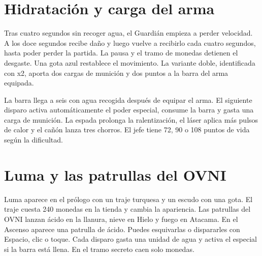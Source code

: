 \section{Hidratación y carga del arma}
Tras cuatro segundos sin recoger agua, el Guardián empieza a perder velocidad. A los doce segundos recibe daño y luego vuelve a recibirlo cada cuatro segundos, hasta poder perder la partida. La pausa y el tramo de monedas detienen el desgaste. Una gota azul restablece el movimiento. La variante doble, identificada con x2, aporta dos cargas de munición y dos puntos a la barra del arma equipada.

La barra llega a seis con agua recogida después de equipar el arma. El siguiente disparo activa automáticamente el poder especial, consume la barra y gasta una carga de munición. La espada prolonga la ralentización, el láser aplica más pulsos de calor y el cañón lanza tres chorros. El jefe tiene 72, 90 o 108 puntos de vida según la dificultad.


\section{Luma y las patrullas del OVNI}
Luma aparece en el prólogo con un traje turquesa y un escudo con una gota. El traje cuesta 240 monedas en la tienda y cambia la apariencia. Las patrullas del OVNI lanzan ácido en la llanura, nieve en Hielo y fuego en Atacama. En el Ascenso aparece una patrulla de ácido. Puedes esquivarlas o dispararles con Espacio, clic o toque. Cada disparo gasta una unidad de agua y activa el especial si la barra está llena. En el tramo secreto caen solo monedas.
